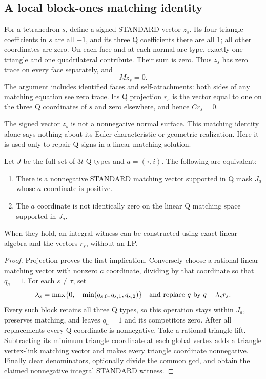 \subsection{A local block-ones matching identity}

For a tetrahedron $s$, define a signed STANDARD vector $z_s$.
Its four triangle coefficients in $s$ are all $-1$, and its three Q
coefficients there are all $1$; all other coordinates are zero.  On each face and
at each normal arc type, exactly one triangle and one quadrilateral
contribute.  Their sum is zero.  Thus $z_s$ has zero trace on every
face separately, and
\[
                                  Mz_s=0.
\]
The argument includes identified faces and self-attachments: both
sides of any matching equation see zero trace.  Its Q projection $r_s$
is the vector equal to one on the three Q coordinates of $s$ and zero
elsewhere, and hence $Cr_s=0$.

The signed vector $z_s$ is not a nonnegative normal surface.  This
matching identity alone says nothing about its Euler characteristic
or geometric realization.  Here it is used only to repair Q signs in
a linear matching solution.

\begin{proposition}
\label{prop:conditional-initial-linear}
Let $J$ be the full set of $3t$ Q types and $a=(\tau,i)$.  The following
are equivalent:
\begin{enumerate}
\item There is a nonnegative STANDARD matching vector supported in Q
      mask $J_a$ whose $a$ coordinate is positive.
\item The $a$ coordinate is not identically zero on the linear Q
      matching space supported in $J_a$.
\end{enumerate}
When they hold, an integral witness can be constructed using exact
linear algebra and the vectors $r_s$, without an LP.
\end{proposition}
\begin{proof}
Projection proves the first implication.  Conversely choose a rational
linear matching vector with nonzero $a$ coordinate, dividing by that
coordinate so that $q_a=1$.  For each $s\ne\tau$, set
\[
 \lambda_s=\max\{0,-\min(q_{s,0},q_{s,1},q_{s,2})\}
 \quad\hbox{and replace }q\hbox{ by }q+\lambda_s r_s.
\]
Every such block retains all three Q types, so this operation stays
within $J_a$, preserves matching, and leaves $q_a=1$ and its competitors
zero.  After all replacements every Q coordinate is nonnegative.
Take a rational triangle lift.  Subtracting its minimum triangle
coordinate at each global vertex adds a triangle vertex-link matching
vector and makes every triangle coordinate nonnegative.  Finally
clear denominators, optionally divide the common gcd, and obtain the
claimed nonnegative integral STANDARD witness.
\end{proof}

